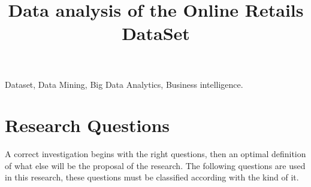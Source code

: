 \documentclass[conference]{IEEEtran}\usepackage[]{graphicx}\usepackage[]{color}
\begin{document}
\title{Data analysis of the Online Retails DataSet}


\author{
}

\maketitle

 

\begin{IEEEkeywords}
	Dataset, Data Mining, Big Data Analytics, Business intelligence.
\end{IEEEkeywords}












  

  

  

  

  

  

  
    


\section{Research Questions}
A correct investigation begins with the right questions, then an optimal definition of what else will be the proposal of the research. The following questions are used in this research, these questions must be classified according with the kind of it.
\end{document}
